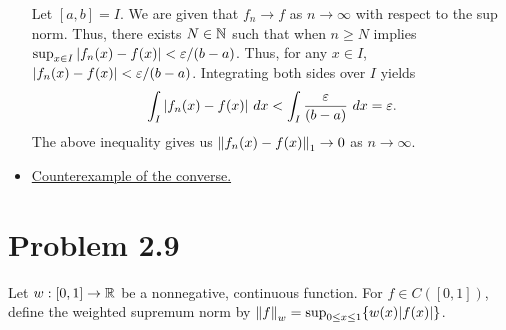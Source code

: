\begin{solution}
\begin{itemize}[-]
        \jump
        Let $[a, b] = I$. We are given that $f_n \rightarrow f$ as $n \rightarrow \infty$ with respect to the sup norm. Thus, there exists $N \in \mathbb{N}$ such that when $n \geq N$ implies $\sup_{x \in I} |f_n(x) - f(x)| < \varepsilon / (b - a)$. Thus, for any $x \in I$, $|f_n(x) - f(x)| < \varepsilon / (b - a)$. Integrating both sides over $I$ yields
        \[\int_I |f_n(x) - f(x)| \ dx < \int_I \frac{\varepsilon}{(b - a)} \ dx = \varepsilon. \]
        The above inequality gives us $\norm{f_n(x) - f(x)}_1 \rightarrow 0$ as $n \rightarrow \infty$. 

        \item \underline{Counterexample of the converse.}
    \end{itemize}
\end{solution}
\clearpage

\newpage
\section{Problem 2.9}
Let $w : [0, 1] \rightarrow \mathbb{R}$ be a nonnegative, continuous function. For $f \in C([0, 1])$, define the weighted supremum norm by $\norm{f}_w = \sup_{0 \leq x \leq 1} \{ w(x)|f(x)|\}$.
